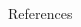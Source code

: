 \documentclass[final,hyperref={pdfpagelabels=false}]{beamer}
\begin{document}
\begin{frame}[t]
\begin{columns}[t]
\begin{column}{.3\textwidth}
    

    \begin{block}{References}
      \linespread{0.928}\selectfont
      \footnotesize{
      }
    \end{block}
    
    

  \end{column} %

  \begin{column}{.02\textwidth}\end{column} %

\end{columns} %

\end{frame} %
\end{document}
